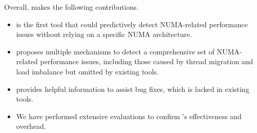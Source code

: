 Overall, \NP{} makes the following contributions. 

\begin{itemize}
    \item \NP{} is the first tool that could predictively detect NUMA-related performance issues without relying on a specific NUMA architecture. 
    \item \NP{} proposes multiple mechanisms to detect a comprehensive set of NUMA-related performance issues, including those caused by thread migration and load imbalance but omitted by existing tools. 
    \item \NP{} provides helpful information to assist bug fixes, which is lacked in existing tools. 
    \item We have performed extensive evaluations to confirm \NP{}'s effectiveness and overhead.  
\end{itemize}




